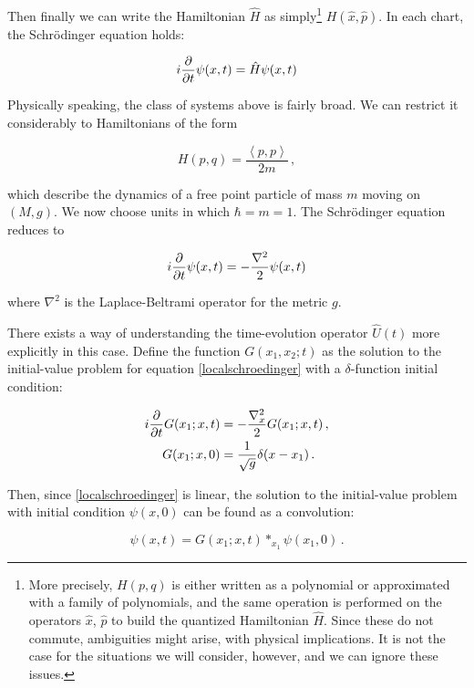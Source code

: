 \documentclass{article}
\begin{document}
Then finally we can write the Hamiltonian $\hat H$ as simply\footnote{More precisely, $H(p,q)$ is either written as a polynomial or approximated with a family of polynomials, and the same operation is performed on the operators $\hat x$, $\hat p$ to build the quantized Hamiltonian $\hat H$. Since these do not commute, ambiguities might arise, with physical implications. It is not the case for the situations we will consider, however, and we can ignore these issues.} $H(\hat x, \hat p)$. In each chart, the Schr\"odinger equation holds:

\begin{equation}
    i \pdv{t} \psi(x,t) = \hat H \psi(x,t)
\end{equation}

Physically speaking, the class of systems above is fairly broad. We can restrict it considerably to Hamiltonians of the form

\begin{equation}
    H(p,q) = \frac{\left\langle p, p \right\rangle}{2m}\,,
\end{equation}

which describe the dynamics of a free point particle of mass $m$ moving on $(M,g)$. We now choose units in which $\hbar = m = 1$. The Schr\"odinger equation reduces to

\begin{equation} \label{localschroedinger}
    i \pdv{t} \psi(x,t) = - \frac{\nabla^2}{2} \psi(x,t)
\end{equation}

where $\nabla^2$ is the Laplace-Beltrami operator for the metric $g$.

There exists a way of understanding the time-evolution operator $\hat U(t)$ more explicitly in this case. Define the function $G(x_1,x_2;t)$ as the solution to the initial-value problem for equation \eqref{localschroedinger} with a $\delta$-function initial condition:

\begin{align}
    i \pdv{t} G(x_1;x,t) & = - \frac{\nabla^2_x}{2} G(x_1;x,t)\,, \\
    G(x_1;x,0) & = \frac{1}{\sqrt{g}} \delta(x-x_1)\,.
\end{align}

Then, since \eqref{localschroedinger} is linear, the solution to the initial-value problem with initial condition $\psi(x,0)$ can be found as a convolution:

\begin{equation}\label{convolutionformula}
    \psi(x,t) = G(x_1;x,t) \ast_{x_1} \psi(x_1,0)\,.
\end{equation}
\end{document}
